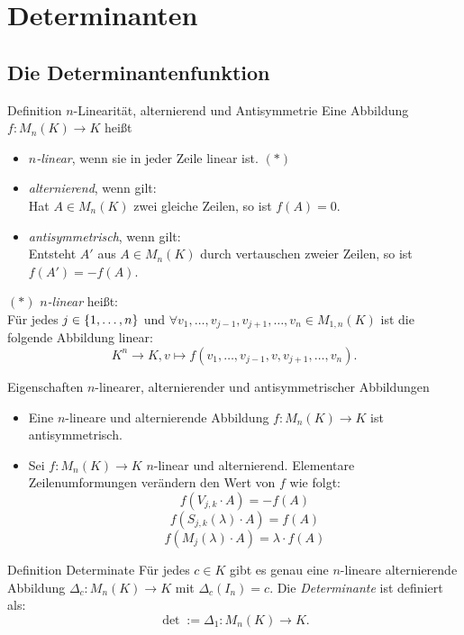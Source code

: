 \documentclass[main.tex]{subfiles}
\begin{document}
\section*{Determinanten}

\subsection*{Die Determinantenfunktion}

\begin{karte}{Definition \(n\)-Linearität, alternierend und Antisymmetrie}
    Eine Abbildung \(f: M_n(K) \rightarrow K\) heißt
    \begin{itemize}
        \item \textit{\(n\)-linear}, wenn sie in jeder Zeile linear ist. \( (*) \)
        \item \textit{alternierend}, wenn gilt: \\
        Hat \(A \in M_n(K)\) zwei gleiche Zeilen, so ist  \(f(A) = 0\).
       \item \textit{antisymmetrisch}, wenn gilt:\\
        Entsteht \(A'\) aus \(A \in M_n(K)\) durch vertauschen zweier
        Zeilen, so ist \(f(A') = -f(A)\).
    \end{itemize}
    \( (*) \) \textit{\(n\)-linear} heißt: \\
    Für jedes \(j \in \{1,\ldots,n\}\) und \(\forall v_1, 
    \ldots,v_{j-1},v_{j+1},\ldots,v_n \in M_{1,n}(K)\) ist 
    die \\ 
    folgende Abbildung linear:
    \[K^n \rightarrow K, v \mapsto f(v_1, \ldots,v_{j-1},v,v_{j+1},\ldots,v_n).\]
\end{karte}
\begin{karte}{Eigenschaften \(n\)-linearer, alternierender und antisymmetrischer Abbildungen}
    \begin{itemize}
        \item Eine \(n\)-lineare und alternierende Abbildung 
        \(f: M_n(K) \rightarrow K\) ist antisymmetrisch.
        \item Sei \(f: M_n(K) \rightarrow K\) \(n\)-linear und alternierend.
        Elementare Zeilenumformungen verändern den Wert von \(f\) wie folgt: 
        \[f(V_{j,k} \cdot A) = -f(A)\]
        \[f(S_{j,k}(\lambda) \cdot A) = f(A)\]
        \[f(M_j(\lambda) \cdot A) = \lambda \cdot f(A)\]
    \end{itemize}
\end{karte}
\begin{karte}{Definition Determinate}
    Für jedes \(c \in K\) gibt es genau eine \(n\)-lineare alternierende
    Abbildung \(\Delta_c: M_n(K) \rightarrow K\) mit \(\Delta_c(I_n) = c \).
    Die \textit{Determinante} ist definiert als: 
    \[\det := \Delta_1: M_n(K) \rightarrow K.\]
\end{karte}
\end{document}
